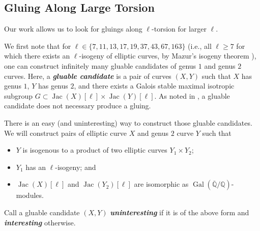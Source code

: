 \documentclass{amsproc}
\numberwithin{equation}{section}
\theoremstyle{definition}
\theoremstyle{remark}
\newcommand{\vocab}[1]{\textbf{\textit{\boldmath #1}}}
\DeclareMathOperator{\Jac}{Jac}
\DeclareMathOperator{\Gal}{Gal}
\newcommand{\QQ}{\mathbb Q}
\newcommand{\Qbar}{\overline{\QQ}}
\newcommand{\GalQ}{\Gal(\Qbar/\QQ)}
\begin{document}
\subsection{Gluing Along Large Torsion}
Our work allows us to look for gluings along $\ell$-torsion for larger $\ell$.

We first note that for $\ell\in\{7,11,13,17,19,37,43,67,163\}$ 
(i.e., all $\ell\geq 7$ for which there exists an $\ell$-isogeny of elliptic curves, by Mazur's isogeny theorem \cite[Thm.~1]{mazur_isogeny}),
one can construct infinitely many gluable candidates of genus $1$ and genus $2$ curves.
Here, a \vocab{gluable candidate} is a pair of curves $(X,Y)$ such that $X$ has genus $1$, $Y$ has genus $2$, and there exists a Galois stable maximal isotropic subgroup $G\subset \Jac(X)[\ell]\times\Jac(Y)[\ell]$.
As noted in , a gluable candidate does not necessary produce a gluing.

There is an easy (and uninteresting) way to construct those gluable candidates.
We will construct pairs of elliptic curve $X$ and genus $2$ curve $Y$ such that
\begin{itemize}
    \item $Y$ is isogenous to a product of two elliptic curves $Y_1\times Y_2$;
    \item $Y_1$ has an  $\ell$-isogeny; and 
    \item $\Jac(X)[\ell]$ and $\Jac(Y_2)[\ell]$ are isomorphic as $\GalQ$-modules.
\end{itemize}

Call a gluable candidate $(X,Y)$ \vocab{uninteresting} if it is of the above form and \vocab{interesting} otherwise.
\end{document}
